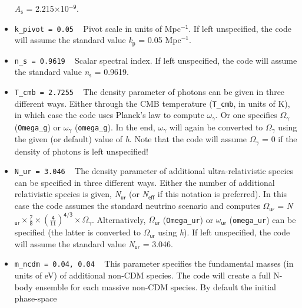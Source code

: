 \documentclass[a4paper,10pt]{article}
\begin{document}
\begin{itemize}
 \textit{A}$_\mathsf{s}$ = 2.215$\times$10$^\mathsf{-9}$.
 \item[] \hspace{-25pt}\texttt{k\_pivot = 0.05} ~  Pivot scale in units of Mpc${}^\mathsf{-1}$. If left unspecified, the code will assume
 the standard value \textit{k}$_\mathsf{p}$ = 0.05 Mpc${}^\mathsf{-1}$.
 \item[] \hspace{-25pt}\texttt{n\_s = 0.9619} ~ Scalar spectral index. If left unspecified, the code will assume the standard value
 \textit{n}$_\mathsf{s}$ = 0.9619.
 \item[] \hspace{-25pt}\texttt{T\_cmb = 2.7255} ~ The density parameter of photons can be given in three different ways. Either through the
 CMB temperature (\texttt{T\_cmb}, in units of K), in which case the code uses Planck's law to compute $\mathsf{\omega}_\mathsf{\gamma}$. Or
 one specifies $\mathsf{\Omega}_\mathsf{\gamma}$ (\texttt{Omega\_g}) or $\mathsf{\omega}_\mathsf{\gamma}$ (\texttt{omega\_g}). In the end,
 $\mathsf{\omega}_\mathsf{\gamma}$ will again be converted to $\mathsf{\Omega}_\mathsf{\gamma}$ using the given (or default) value of
 \textit{h}. Note that the code will assume $\mathsf{\Omega}_\mathsf{\gamma}$ = 0 if the density of photons is left unspecified!
 \item[] \hspace{-25pt}\texttt{N\_ur = 3.046} ~ The density parameter of additional ultra-relativistic species can be specified in three
 different ways. Either the number of additional relativistic species is given, \textit{N}$_\mathsf{ur}$ (or \textit{N}$_\mathsf{eff}$ if
 this notation is preferred). In this case the code assumes the standard neutrino scenario and computes $\mathsf{\Omega}_\mathsf{ur}$ =
 \textit{N}$_\mathsf{ur} \times \frac{\mathsf{7}}{\mathsf{8}} \times \left(\frac{\mathsf{4}}{\mathsf{11}}\right)^{\mathsf{4}/\mathsf{3}}
 \times \mathsf{\Omega}_\mathsf{\gamma}$. Alternatively, $\mathsf{\Omega}_\mathsf{ur}$ (\texttt{Omega\_ur}) or $\mathsf{\omega}_\mathsf{ur}$
 (\texttt{omega\_ur}) can be specified (the latter is converted to $\mathsf{\Omega}_\mathsf{ur}$ using \textit{h}). If left unspecified, the
 code will assume the standard value \textit{N}$_\mathsf{ur}$ = 3.046.
 \item[] \hspace{-25pt}\texttt{m\_ncdm = 0.04, 0.04} ~ This parameter specifies the fundamental masses (in units of eV) of additional
 non-CDM species. The code will create a full N-body ensemble for each massive non-CDM species. By default the initial phase-space

\end{itemize}
\end{document}
